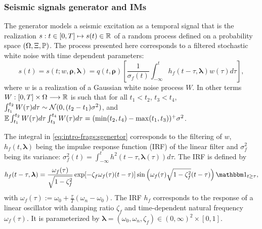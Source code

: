 


\subsubsection{Seismic signals generator and IMs}


The generator models a seismic excitation as a temporal signal that is the realization
$s:t\in[0,T]\mapsto s(t)\in\mathbb{R}$ of a random process defined on a probability space $(\Omega,\Xi,\mathbb{P})$. 
The process presented here corresponds to a filtered stochastic white noise with time dependent parameters:
    \begin{equation}\label{eq:intro-frags:sgenertor}
        s(t)= s(t;w,\boldsymbol{\rho},\boldsymbol{\lambda}) = q(t,\boldsymbol\rho)\left[\frac{1}{\sigma_f(t)}\int_{-\infty}^t h_f(t-\tau,\boldsymbol\lambda)w(\tau)d\tau \right],
    \end{equation}
where $w$ is a realization of a Gaussian white noise process $W$. In other terms $W:[0,T]\times\Omega\longrightarrow\mathbb{R}$ is such that for all $t_1<t_2$, $t_3<t_4$, 
$\int_{t_1}^{t_2}W(\tau)d\tau\sim\mathcal{N}(0,(t_2-t_1)\sigma^2)$, and $\mathbb{E}\int_{t_1}^{t_2}W(\tau)d\tau\int_{t_3}^{t_4}W(\tau)d\tau=(\min(t_2,t_4)-\max(t_1,t_3))^+\sigma^2$.


The integral in \cref{eq:intro-frags:sgenertor} corresponds to the filtering of $w$, $h_f(t,\boldsymbol{\lambda})$ being the impulse response function (IRF) of the linear filter and $\sigma_f^2$ being its variance: $\sigma_f^2(t)=\int_{-\infty}^th^2(t-\tau,\boldsymbol{\lambda}(\tau))d\tau$. The IRF is defined by
    \begin{equation}
        h_f(t-\tau,\boldsymbol{\lambda}) = \frac{\omega_f(\tau)}{\sqrt{1-\zeta^2_f}}\exp[-\zeta_f\omega_f(\tau)(t-\tau)]\sin\left(\omega_f(\tau)\sqrt{1-\zeta^2_f}(t-\tau)\right)\indic_{t\geq\tau},
    \end{equation}
with $\omega_f(\tau):=\omega_0+\frac{\tau}{T}(\omega_n-\omega_0)$. 
The IRF $h_f$ corresponds to the response of a linear oscillator with damping ratio $\zeta_f$ and time-dependent natural frequency $\omega_f(\tau)$. It is parameterized by $\boldsymbol{\lambda}=(\omega_0,\omega_n,\zeta_f)\in(0,\infty)^2\times[0,1]$.





